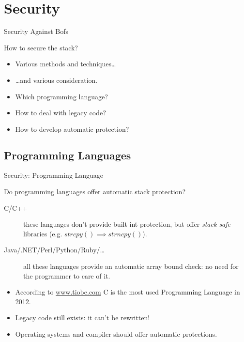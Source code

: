 \section{Security}
\begin{frame}{Security Against Bofs}
	\begin{block}{How to secure the stack?}
		\begin{itemize}
			\item Various methods and techniques\ldots
			\item \ldots{}and various consideration.
			\item Which programming language?
			\item How to deal with legacy code?
			\item How to develop automatic protection?
		\end{itemize}
	\end{block}
\end{frame}

\subsection{Programming Languages}
\begin{frame}{Security: Programming Language}
	\begin{block}{Do programming languages offer automatic stack protection?}
		\begin{description}
			\item[C/C++]these languages don't provide built-int protection, but offer
				\emph{stack-safe} libraries (e.g. $strcpy() \implies strncpy()$).
			\item[Java/.NET/Perl/Python/Ruby/\ldots]all these languages provide an
				automatic array bound check: no need for the programmer to care of it.
		\end{description}
		\begin{itemize}
			\item According to \url{www.tiobe.com} C is the most used Programming Language in 2012.
			\item \alert{Legacy code still exists: it can't be rewritten!}
			\item Operating systems and compiler should offer automatic protections.
		\end{itemize}
	\end{block}
\end{frame}


